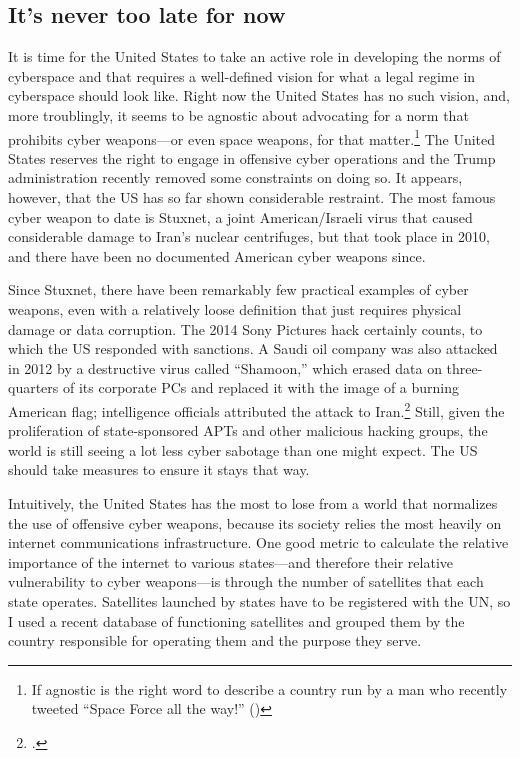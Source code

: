 \documentclass[11pt]{memoir}
\begin{document}
\subsection{It's never too late for now}
It is time for the United States to take an active role in developing the norms of cyberspace and that requires a well-defined vision for what a legal regime in cyberspace should look like. Right now the United States has no such vision, and, more troublingly, it seems to be agnostic about advocating for a norm that prohibits cyber weapons---or even space weapons, for that matter.\footnote{If agnostic is the right word to describe a country run by a man who recently tweeted ``Space Force all the way!'' (\cite{trump_twitter_2018})} The United States reserves the right to engage in offensive cyber operations and the Trump administration recently removed some constraints on doing so. It appears, however, that the US has so far shown considerable restraint. The most famous cyber weapon to date is Stuxnet, a joint American/Israeli virus that caused considerable damage to Iran's nuclear centrifuges, but that took place in 2010, and there have been no documented American cyber weapons since.

Since Stuxnet, there have been remarkably few practical examples of cyber weapons, even with a relatively loose definition that just requires physical damage or data corruption. The 2014 Sony Pictures hack certainly counts, to which the US responded with sanctions. A Saudi oil company was also attacked in 2012 by a destructive virus called ``Shamoon,'' which erased data on three-quarters of its corporate PCs and replaced it with the image of a burning American flag; intelligence officials attributed the attack to Iran.\footcite{perlroth_cyberattack_2012} Still, given the proliferation of state-sponsored APTs and other malicious hacking groups, the world is still seeing a lot less cyber sabotage than one might expect. The US should take measures to ensure it stays that way.

Intuitively, the United States has the most to lose from a world that normalizes the use of offensive cyber weapons, because its society relies the most heavily on internet communications infrastructure. One good metric to calculate the relative importance of the internet to various states---and therefore their relative vulnerability to cyber weapons---is through the number of satellites that each state operates. Satellites launched by states have to be registered with the UN, so I used a recent database of functioning satellites and grouped them by the country responsible for operating them and the purpose they serve.
\end{document}
